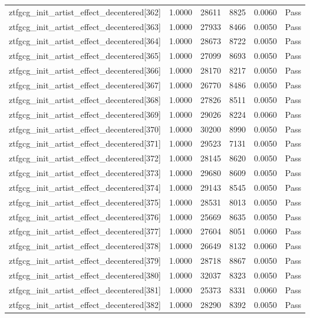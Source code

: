 \begin{table}[htbp]
\begin{tabular}{llrrll}
ztfgcg\_init\_artist\_effect\_decentered[362] & 1.0000 & 28611 & 8825 & 0.0060 & Pass \\
ztfgcg\_init\_artist\_effect\_decentered[363] & 1.0000 & 27933 & 8466 & 0.0050 & Pass \\
ztfgcg\_init\_artist\_effect\_decentered[364] & 1.0000 & 28673 & 8722 & 0.0050 & Pass \\
ztfgcg\_init\_artist\_effect\_decentered[365] & 1.0000 & 27099 & 8693 & 0.0050 & Pass \\
ztfgcg\_init\_artist\_effect\_decentered[366] & 1.0000 & 28170 & 8217 & 0.0050 & Pass \\
ztfgcg\_init\_artist\_effect\_decentered[367] & 1.0000 & 26770 & 8486 & 0.0050 & Pass \\
ztfgcg\_init\_artist\_effect\_decentered[368] & 1.0000 & 27826 & 8511 & 0.0050 & Pass \\
ztfgcg\_init\_artist\_effect\_decentered[369] & 1.0000 & 29026 & 8224 & 0.0060 & Pass \\
ztfgcg\_init\_artist\_effect\_decentered[370] & 1.0000 & 30200 & 8990 & 0.0050 & Pass \\
ztfgcg\_init\_artist\_effect\_decentered[371] & 1.0000 & 29523 & 7131 & 0.0050 & Pass \\
ztfgcg\_init\_artist\_effect\_decentered[372] & 1.0000 & 28145 & 8620 & 0.0050 & Pass \\
ztfgcg\_init\_artist\_effect\_decentered[373] & 1.0000 & 29680 & 8609 & 0.0050 & Pass \\
ztfgcg\_init\_artist\_effect\_decentered[374] & 1.0000 & 29143 & 8545 & 0.0050 & Pass \\
ztfgcg\_init\_artist\_effect\_decentered[375] & 1.0000 & 28531 & 8013 & 0.0050 & Pass \\
ztfgcg\_init\_artist\_effect\_decentered[376] & 1.0000 & 25669 & 8635 & 0.0050 & Pass \\
ztfgcg\_init\_artist\_effect\_decentered[377] & 1.0000 & 27604 & 8051 & 0.0060 & Pass \\
ztfgcg\_init\_artist\_effect\_decentered[378] & 1.0000 & 26649 & 8132 & 0.0060 & Pass \\
ztfgcg\_init\_artist\_effect\_decentered[379] & 1.0000 & 28718 & 8867 & 0.0050 & Pass \\
ztfgcg\_init\_artist\_effect\_decentered[380] & 1.0000 & 32037 & 8323 & 0.0050 & Pass \\
ztfgcg\_init\_artist\_effect\_decentered[381] & 1.0000 & 25373 & 8331 & 0.0060 & Pass \\
ztfgcg\_init\_artist\_effect\_decentered[382] & 1.0000 & 28290 & 8392 & 0.0050 & Pass \\

\end{tabular}
\end{table}

